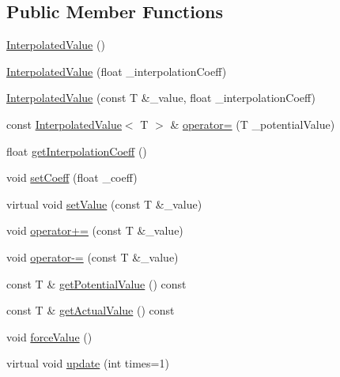 \subsection*{Public Member Functions}
\begin{CompactItemize}
\item 
\hyperlink{class_j_g_t_l_1_1_interpolated_value_bccb0ff62b1196afd31d0fec4794f3e7}{Interpolated\-Value} ()
\item 
\hyperlink{class_j_g_t_l_1_1_interpolated_value_9664708ef92a7c352429c37d0f463f2f}{Interpolated\-Value} (float \_\-interpolation\-Coeff)
\item 
\hyperlink{class_j_g_t_l_1_1_interpolated_value_d8bccc51f6cb96e1bfe433d5b83a94ba}{Interpolated\-Value} (const T \&\_\-value, float \_\-interpolation\-Coeff)
\item 
const \hyperlink{class_j_g_t_l_1_1_interpolated_value}{Interpolated\-Value}$<$ T $>$ \& \hyperlink{class_j_g_t_l_1_1_interpolated_value_30b679bad94ef7adf003bf99e5756a53}{operator=} (T \_\-potential\-Value)
\item 
float \hyperlink{class_j_g_t_l_1_1_interpolated_value_79acd7ca199cd56a2930dd362f0e78ef}{get\-Interpolation\-Coeff} ()
\item 
void \hyperlink{class_j_g_t_l_1_1_interpolated_value_fbd2118a23563bf541c1388131035ef5}{set\-Coeff} (float \_\-coeff)
\item 
virtual void \hyperlink{class_j_g_t_l_1_1_interpolated_value_eaeff236b97efbf0c616333e1b94b210}{set\-Value} (const T \&\_\-value)
\item 
void \hyperlink{class_j_g_t_l_1_1_interpolated_value_58856554c17b6b4b815e2e74e0dc5b5b}{operator+=} (const T \&\_\-value)
\item 
void \hyperlink{class_j_g_t_l_1_1_interpolated_value_d8cd429d3c46e1a49c5791a60deb7570}{operator-=} (const T \&\_\-value)
\item 
const T \& \hyperlink{class_j_g_t_l_1_1_interpolated_value_a3f9c94d927a923eaab2d6cec96d4dd7}{get\-Potential\-Value} () const
\item 
const T \& \hyperlink{class_j_g_t_l_1_1_interpolated_value_7197bfe20e331bfa6be2cbe122b2ffba}{get\-Actual\-Value} () const
\item 
void \hyperlink{class_j_g_t_l_1_1_interpolated_value_3098413c5cb85973a20b7066a5ed3171}{force\-Value} ()
\item 
virtual void \hyperlink{class_j_g_t_l_1_1_interpolated_value_bc1a6a8d484921bc309289c400bf0fbe}{update} (int times=1)
\end{CompactItemize}
